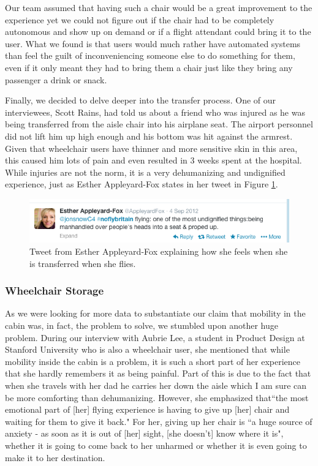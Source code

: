 Our team assumed that having such a chair would be a great improvement to the experience yet we could not figure out if the chair had to be completely autonomous and show up on demand or if a flight attendant could bring it to the user. What we found is that users would much rather have automated systems than feel the guilt of inconveniencing someone else to do something for them, even if it only meant they had to bring them a chair just like they bring any passenger a drink or snack. 

Finally, we decided to delve deeper into the transfer process. One of our interviewees, Scott Rains, had told us about a friend who was injured as he was being transferred from the aisle chair into his airplane seat. The airport personnel did not lift him up high enough and his bottom was hit against the armrest. Given that wheelchair users have thinner and more sensitive skin in this area, this caused him lots of pain and even resulted in 3 weeks spent at the hospital. While injuries are not the norm, it is a very dehumanizing and undignified experience, just as Esther Appleyard-Fox states in her tweet in Figure \ref{fig:MobilityTweet.png}. 


\begin{figure}[h]
  \centering
     \includegraphics[width=12cm]{images/MobilityTweet.png}
   \caption{Tweet from Esther Appleyard-Fox explaining how she feels when she is transferred when she flies. }
  \label{fig:MobilityTweet.png}
\end{figure}


\subsubsection*{Wheelchair Storage}

As we were looking for more data to substantiate our claim that mobility in the cabin was, in fact, the problem to solve, we stumbled upon another huge problem. During our interview with Aubrie Lee, a student in Product Design at Stanford University who is also a wheelchair user, she mentioned that while mobility inside the cabin is a problem, it is such a short part of her experience that she hardly remembers it as being painful. Part of this is due to the fact that when she travels with her dad he carries her down the aisle which I am sure can be more comforting than dehumanizing. However, she emphasized that``the most emotional part of [her] flying experience is having to give up [her] chair and waiting for them to give it back." For her, giving up her chair is ``a huge source of anxiety - as soon as it is out of [her] sight, [she doesn't] know where it is", whether it is going to come back to her unharmed or whether it is even going to make it to her destination. 

